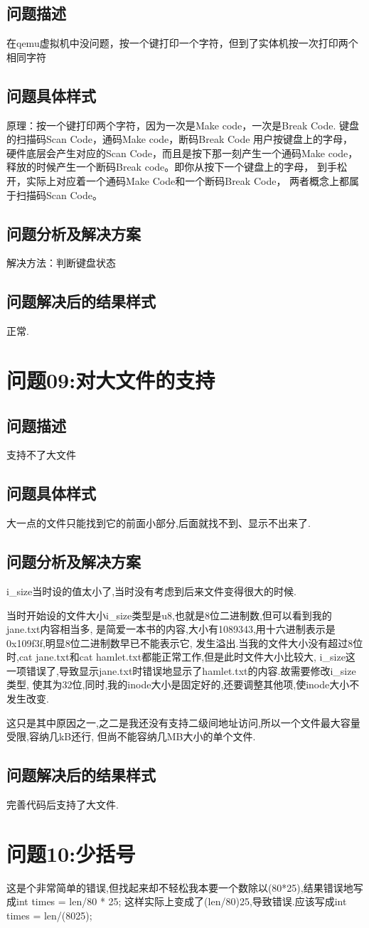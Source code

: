 \subsection{问题描述}
在qemu虚拟机中没问题，按一个键打印一个字符，但到了实体机按一次打印两个相同字符

\subsection{问题具体样式}
原理：按一个键打印两个字符，因为一次是Make code，一次是Break Code.
键盘的扫描码Scan Code，通码Make code，断码Break Code 用户按键盘上的字母，
硬件底层会产生对应的Scan Code，而且是按下那一刻产生一个通码Make code，
释放的时候产生一个断码Break code。即你从按下一个键盘上的字母，
到手松开，实际上对应着一个通码Make Code和一个断码Break Code，
两者概念上都属于扫描码Scan Code。

\subsection{问题分析及解决方案}
解决方法：判断键盘状态
\subsection{问题解决后的结果样式}
正常.

\section{问题09:对大文件的支持}
\subsection{问题描述}
支持不了大文件
\subsection{问题具体样式}
大一点的文件只能找到它的前面小部分,后面就找不到、显示不出来了.
\subsection{问题分析及解决方案}
i\_size当时设的值太小了,当时没有考虑到后来文件变得很大的时候.

当时开始设的文件大小i\_size类型是u8,也就是8位二进制数,但可以看到我的jane.txt内容相当多,
是简爱一本书的内容,大小有1089343,用十六进制表示是0x109f3f,明显8位二进制数早已不能表示它,
发生溢出.当我的文件大小没有超过8位时,cat jane.txt和cat hamlet.txt都能正常工作,但是此时文件大小比较大,
i\_size这一项错误了,导致显示jane.txt时错误地显示了hamlet.txt的内容.故需要修改i\_size类型,
使其为32位,同时,我的inode大小是固定好的,还要调整其他项,使inode大小不发生改变.

这只是其中原因之一,之二是我还没有支持二级间地址访问,所以一个文件最大容量受限,容纳几kB还行,
但尚不能容纳几MB大小的单个文件.

\subsection{问题解决后的结果样式}
完善代码后支持了大文件.

\section{问题10:少括号}

这是个非常简单的错误,但找起来却不轻松我本要一个数除以(80*25),结果错误地写成int times = len/80 * 25;
这样实际上变成了(len/80)25,导致错误.应该写成int times = len/(8025);



